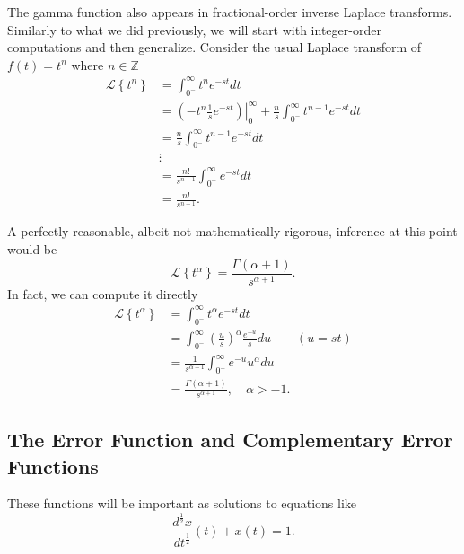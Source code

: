 The gamma function also appears in fractional-order inverse Laplace transforms. Similarly to what we did previously, we will start with integer-order computations and then generalize. Consider the usual Laplace transform of $f(t) = t^n$ where $n \in \mathbb Z$
\begin{align*}
  \mathcal L \left\{ t^n \right\} &= \int_{0^-}^\infty t^n e^{-s t} dt \\
  &= \left. \left( - t^n \frac{1}{s} e^{-s t} \right) \right|_0^\infty + \frac{n}{s}  \int_{0^-}^\infty t^{n-1} e^{-st} dt \\
    &= \frac{n}{s}  \int_{0^-}^\infty t^{n-1} e^{-st} dt  \\
    & \vdots \\
    &= \frac{n!}{s^{n+1}} \int_{0^-}^\infty e^{-s t} dt  \\
    &= \frac{n!}{s^{n+1}}. 
\end{align*}

A perfectly reasonable, albeit not mathematically rigorous, inference at this point would be 
\begin{equation*}
  \mathcal L  \left\{ t^\alpha \right\} =  \frac{\Gamma \left( \alpha + 1 \right)}{s^{\alpha + 1}}.
\end{equation*}
In fact, we can compute it directly
\begin{align*}
  \mathcal L \left\{ t^\alpha \right\} &= \int_{0^-}^\infty t^\alpha e^{-s t} dt \\
  &= \int_{0^-}^\infty \left( \frac{u}{s} \right)^\alpha \frac{e^{-u}}{s} du \qquad \left( u = st \right) \\
  &= \frac{1}{s^{\alpha + 1}} \int_{0^-}^\infty e^{-u} u^\alpha du \\
  &= \frac{\Gamma \left( \alpha + 1 \right)}{s^{\alpha + 1}}, \quad \alpha > -1.
\end{align*}

\subsection{The Error Function and Complementary Error Functions}
These functions will be important as solutions to equations like
\begin{equation*}
  \frac{d^\frac{1}{2} x}{d t^\frac{1}{2}}(t) + x(t) = 1.
\end{equation*}

